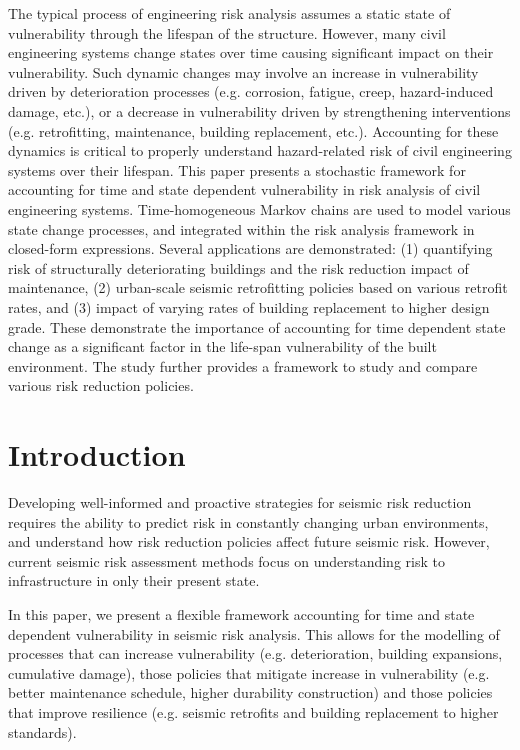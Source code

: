 The typical process of engineering risk analysis assumes a static state of vulnerability through the lifespan of the structure. However, many civil engineering systems change states over time causing significant impact on their vulnerability. Such dynamic changes may involve an increase in vulnerability driven by deterioration processes (e.g. corrosion, fatigue, creep, hazard-induced damage, etc.), or a decrease in vulnerability driven by strengthening interventions (e.g. retrofitting, maintenance, building replacement, etc.). Accounting for these dynamics is critical to properly understand hazard-related risk of civil engineering systems over their lifespan. This paper presents a stochastic framework for accounting for time and state dependent vulnerability in risk analysis of civil engineering systems. Time-homogeneous Markov chains are used to model various state change processes, and integrated within the risk analysis framework in closed-form expressions. Several applications are demonstrated: (1) quantifying risk of structurally deteriorating buildings and the risk reduction impact of maintenance, (2) urban-scale seismic retrofitting policies based on various retrofit rates, and (3) impact of varying rates of building replacement to higher design grade. These demonstrate the importance of accounting for time dependent state change as a significant factor in the life-span vulnerability of the built environment. The study further provides a framework to study and compare various risk reduction policies.



\section{Introduction}
Developing well-informed and proactive strategies for seismic risk reduction requires the ability to predict risk in constantly changing urban environments, and understand how risk reduction policies affect future seismic risk. However, current seismic risk assessment methods focus on understanding risk to infrastructure in only their present state.

In this paper, we present a flexible framework accounting for time and state dependent vulnerability in seismic risk analysis. This allows for the modelling of processes that can increase vulnerability (e.g. deterioration, building expansions, cumulative damage), those policies that mitigate increase in vulnerability (e.g. better maintenance schedule, higher durability construction) and those policies that improve resilience (e.g. seismic retrofits and building replacement to higher standards).


